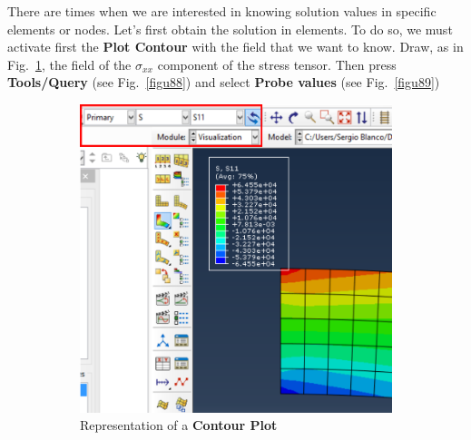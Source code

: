 \begin{enumerate}
  There are times when we are interested in knowing solution values in
  specific elements or nodes. Let's first obtain the solution in
  elements. To do so, we must activate first the \textbf{Plot
    Contour} with the field that we want to know. Draw, as in
  Fig.~\ref{figu87}, the field of the $\sigma_{xx}$ component of the
  stress tensor. Then press \textbf{Tools/Query} (see
  Fig.~\ref{figu88}) and select \textbf{Probe values} (see
  Fig.~\ref{figu89})
  \begin{figure}[H]
    \centering
    \begin{subfigure}{0.35\textwidth}
      \includegraphics[width=\textwidth]{./body/images/imagen87.pdf}
      \caption{Representation of a \textbf{Contour Plot}}
      \label{figu87}
    \end{subfigure}%
    ~ %
    \begin{subfigure}{0.29\textwidth}

\end{subfigure}
\end{figure}
\end{enumerate}
